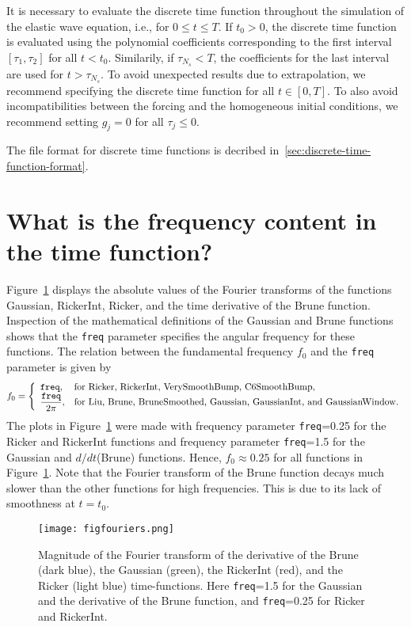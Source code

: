 \documentclass[11pt]{report}
\begin{document}
It is necessary to evaluate the discrete time function throughout the simulation of the elastic wave
equation, i.e., for $0\leq t\leq T$. If $t_0>0$, the discrete time function is evaluated using the
polynomial coefficients corresponding to the first interval $[\tau_1,\tau_2]$ for all
$t<t_0$. Similarily, if $\tau_{N_s}<T$, the coefficients for the last interval are used for
$t>\tau_{N_s}$. To avoid unexpected results due to extrapolation, we recommend specifying the
discrete time function for all $t\in[0,T]$. To also avoid incompatibilities between the forcing and
the homogeneous initial conditions, we recommend setting $g_j=0$ for all $\tau_j\leq 0$.

The file format for discrete time functions is decribed in~\ref{sec:discrete-time-function-format}.


\section{What is the frequency content in the time function?}\label{sec:freq}

Figure~\ref{fig:fouriers} displays the absolute values of the Fourier transforms of the
functions Gaussian, RickerInt, Ricker, and the time derivative of the Brune
function. Inspection of the mathematical definitions of the Gaussian and Brune functions
shows that the {\tt freq} parameter specifies the angular frequency for these
functions. The relation between the fundamental frequency $f_0$ and the {\tt freq} parameter is
given by
\begin{equation}\label{eq:angular-scaling}
f_0 = \left\{ \begin{array}{ll}
 {\tt freq},& \mbox{for Ricker, RickerInt, VerySmoothBump, C6SmoothBump},\\
 \dfrac{\tt freq}{2\pi},& \mbox{for Liu, Brune, BruneSmoothed, Gaussian, GaussianInt, and GaussianWindow}.
\end{array}\right.
\end{equation}
The plots in Figure~\ref{fig:fouriers} were made with frequency parameter {\tt freq}=0.25 for the
Ricker and RickerInt functions and frequency parameter {\tt freq}=1.5 for the Gaussian and
$d/dt$(Brune) functions. Hence, $f_0\approx 0.25$ for all functions in
Figure~\ref{fig:fouriers}. Note that the Fourier
transform of the Brune function decays much slower than the other functions for high
frequencies. This is due to its lack of smoothness at $t=t_0$.
\begin{figure}
\begin{center}
\texttt{[image: figfouriers.png]}
\caption{ Magnitude of the Fourier transform of the derivative of the Brune (dark
  blue), the Gaussian (green), the RickerInt (red), and the Ricker (light blue)
  time-functions. Here {\tt freq}=1.5 for the Gaussian and the derivative of the Brune
  function, and {\tt freq}=0.25 for Ricker and RickerInt.}
\label{fig:fouriers}
\end{center}
\end{figure}
\end{document}
